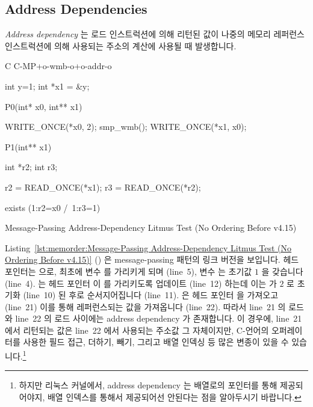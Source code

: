 \subsection{Address Dependencies}
\label{sec:memorder:Address Dependencies}

\emph{Address dependency} 는 로드 인스트럭션에 의해 리턴된 값이 나중의 메모리
레퍼런스 인스트럭션에 의해 사용되는 주소의 계산에 사용될 때 발생합니다.

\begin{listing}[tbp]
{ \scriptsize
\begin{verbbox}[\LstLineNo]
C C-MP+o-wmb-o+o-addr-o

{
int y=1;
int *x1 = &y;
}

P0(int* x0, int** x1) {

  WRITE_ONCE(*x0, 2);
  smp_wmb();
  WRITE_ONCE(*x1, x0);

}

P1(int** x1) {

  int *r2;
  int r3;

  r2 = READ_ONCE(*x1);
  r3 = READ_ONCE(*r2);

}

exists (1:r2=x0 /\ 1:r3=1)
\end{verbbox}
}
\centering
\theverbbox
\caption{Message-Passing Address-Dependency Litmus Test (No Ordering Before v4.15)}
\label{lst:memorder:Message-Passing Address-Dependency Litmus Test (No Ordering Before v4.15)}
\end{listing}

Listing~\ref{lst:memorder:Message-Passing Address-Dependency Litmus Test (No Ordering Before v4.15)}
()
은 message-passing 패턴의 링크 버전을 보입니다.
헤드 포인터는  으로, 최초에  변수  를 가리키게 되며
(line~5), 변수  는 초기값 $1$ 을 갖습니다 (line~4).
 는 헤드 포인터  이  를 가리키도록 업데이트 (line~12)
하는데 이는  가 $2$ 로 초기화 (line~10) 된 후로 순서지어집니다
(line~11).
 은 헤드 포인터  을 가져오고 (line~21) 이를 통해 레퍼런스되는
값을 가져옵니다 (line~22).
따라서 line~21 의 로드와 line~22 의 로드 사이에는 address dependency 가
존재합니다.
이 경우에, line~21 에서 리턴되는 값은 line~22 에서 사용되는 주소값 그
자체이지만, C-언어의 \co{->} 오퍼레이터를 사용한 필드 접근, 더하기, 빼기,
그리고 배열 인덱싱 등 많은 변종이 있을 수 있습니다.\footnote{
	하지만 리눅스 커널에서, address dependency 는 배열로의 포인터를 통해
	제공되어야지, 배열 인덱스를 통해서 제공되어선 안된다는 점을 알아두시기
	바랍니다.}
\iffalse


